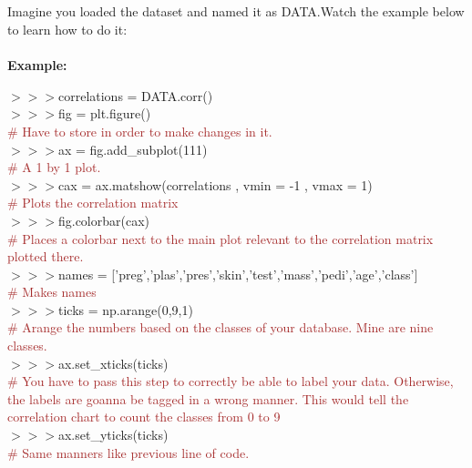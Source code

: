 \documentclass[a4paper,18pt]{article}
\begin{document}

\subsection{\colorbox {matgreen}{\color{white}{\large Plotting Correlation Graph}}}
Imagine you loaded the dataset and named it as DATA.Watch the example below to learn how to do it:\\\\
\textbf{Example:\\}

$>>>$correlations = DATA.corr()\\

$>>>$fig = plt.figure()\\{\textcolor{brown}{\# Have to store in order to make changes in it.}}\\

$>>>$ax = fig.add\_subplot(111)\\{\textcolor{brown}{\# A 1 by 1 plot. }}\\

$>>>$cax = ax.matshow(correlations , vmin = -1 , vmax = 1)\\{\textcolor{brown}{\# Plots the correlation matrix}}\\

$>>>$fig.colorbar(cax)\\{\textcolor{brown}{\# Places a colorbar next to the main plot relevant to the correlation matrix plotted there.}}\\

$>>>$names = ['preg','plas','pres','skin','test','mass','pedi','age','class']\\{\textcolor{brown}{\# Makes names}}\\

$>>>$ticks = np.arange(0,9,1)\\{\textcolor{brown}{\# Arange the numbers based on the classes of your database. Mine are nine classes.}}\\

$>>>$ax.set\_xticks(ticks)\\{\textcolor{brown}{\# You have to pass this step to correctly be able to label your data. Otherwise, the labels are goanna be tagged in a wrong manner. This would tell the correlation chart to count the classes from 0 to 9}}\\

$>>>$ax.set\_yticks(ticks)\\{\textcolor{brown}{\# Same manners like previous line of code.}}\\
\end{document}

